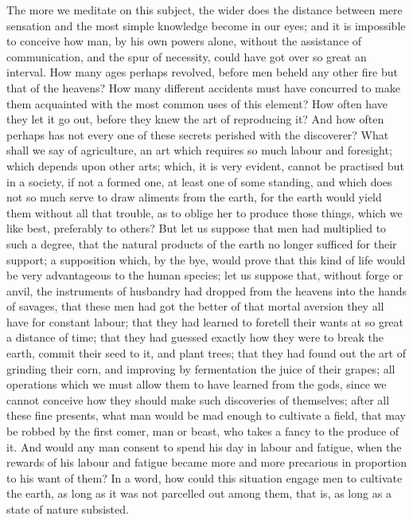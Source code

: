 \documentclass[11pt,twocolumn]{ltugboat}
\begin{document}
The more we meditate on this subject, the wider does the distance
between mere sensation and the most simple knowledge become in our
eyes; and it is impossible to conceive how man, by his own powers
alone, without the assistance of communication, and the spur of
necessity, could have got over so great an interval. How many ages
perhaps revolved, before men beheld any other fire but that of the
heavens? How many different accidents must have concurred to make them
acquainted with the most common uses of this element? How often have
they let it go out, before they knew the art of reproducing it? And
how often perhaps has not every one of these secrets perished with the
discoverer? What shall we say of agriculture, an art which requires so
much labour and foresight; which depends upon other arts; which, it is
very evident, cannot be practised but in a society, if not a formed
one, at least one of some standing, and which does not so much serve
to draw aliments from the earth, for the earth would yield them
without all that trouble, as to oblige her to produce those things,
which we like best, preferably to others? But let us suppose that men
had multiplied to such a degree, that the natural products of the
earth no longer sufficed for their support; a supposition which, by
the bye, would prove that this kind of life would be very advantageous
to the human species; let us suppose that, without forge or anvil, the
instruments of husbandry had dropped from the heavens into the hands
of savages, that these men had got the better of that mortal aversion
they all have for constant labour; that they had learned to foretell
their wants at so great a distance of time; that they had guessed
exactly how they were to break the earth, commit their seed to it, and
plant trees; that they had found out the art of grinding their corn,
and improving by fermentation the juice of their grapes; all
operations which we must allow them to have learned from the gods,
since we cannot conceive how they should make such discoveries of
themselves; after all these fine presents, what man would be mad
enough to cultivate a field, that may be robbed by the first comer,
man or beast, who takes a fancy to the produce of it. And would any
man consent to spend his day in labour and fatigue, when the rewards
of his labour and fatigue became more and more precarious in
proportion to his want of them? In a word, how could this situation
engage men to cultivate the earth, as long as it was not parcelled out
among them, that is, as long as a state of nature subsisted.
\end{document}
